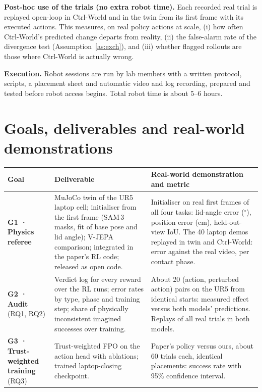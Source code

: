 \documentclass[11pt,a4paper]{article}
\theoremstyle{plain}
\theoremstyle{definition}
\theoremstyle{remark}
\begin{document}
\textbf{Post-hoc use of the trials (no extra robot time).} Each recorded real trial is replayed open-loop in Ctrl-World and in the twin from its first frame with its executed actions. This measures, on real policy actions at scale, (i) how often Ctrl-World's predicted change departs from reality, (ii) the false-alarm rate of the divergence test (Assumption~\ref{as:exch}), and (iii) whether flagged rollouts are those where Ctrl-World is actually wrong.

\textbf{Execution.} Robot sessions are run by lab members with a written protocol, scripts, a placement sheet and automatic video and log recording, prepared and tested before robot access begins. Total robot time is about 5--6 hours.

\section{Goals, deliverables and real-world demonstrations}\label{sec:deliverables}
\begin{center}\small
\begin{tabularx}{\linewidth}{@{}>{\raggedright\arraybackslash}p{2.7cm}>{\raggedright\arraybackslash}X>{\raggedright\arraybackslash}X@{}}
\toprule
\textbf{Goal} & \textbf{Deliverable} & \textbf{Real-world demonstration and metric}\\
\midrule
\textbf{G1 · Physics referee} & MuJoCo twin of the UR5 laptop cell; initialiser from the first frame (SAM\,3 masks, fit of base pose and lid angle); V-JEPA comparison; integrated in the paper's RL code; released as open code. & Initialiser on real first frames of all four tasks: lid-angle error ($^\circ$), position error (cm), held-out-view IoU. The 40 laptop demos replayed in twin and Ctrl-World: error against the real video, per contact phase.\\
\midrule
\textbf{G2 · Audit} (RQ1, RQ2) & Verdict log for every reward over the RL runs; error rates by type, phase and training step; share of physically inconsistent imagined successes over training. & About 20 (action, perturbed action) pairs on the UR5 from identical starts: measured effect versus both models' predictions. Replays of all real trials in both models.\\
\midrule
\textbf{G3 · Trust-weighted training} (RQ3) & Trust-weighted FPO on the action head with ablations; trained laptop-closing checkpoint. & Paper's policy versus ours, about 60 trials each, identical placements: success rate with 95\% confidence interval.\\
\bottomrule
\end{tabularx}
\end{center}
\end{document}
